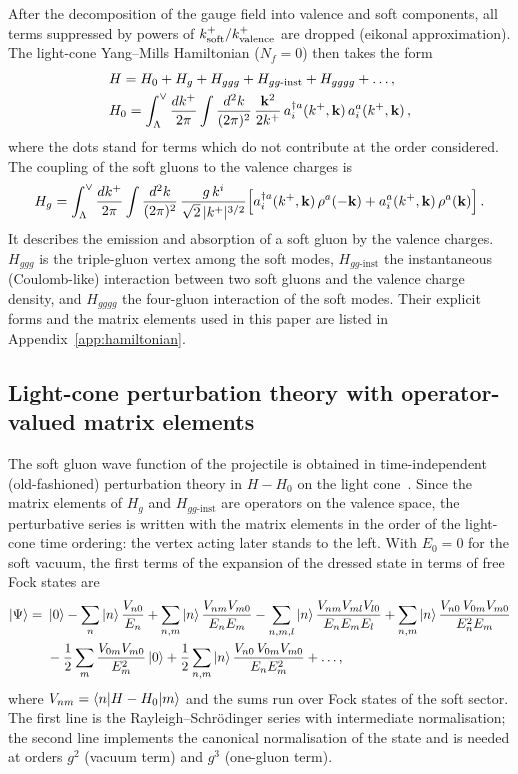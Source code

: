 After the decomposition of the gauge field into valence and soft components, all terms suppressed by powers of $k^+_{\rm soft}/k^+_{\rm valence}$ are dropped (eikonal approximation). The light-cone Yang--Mills Hamiltonian ($N_f=0$) then takes the form~\cite{Lublinsky:2016meo,Radhakrishnan:2026soft}
\begin{align}\label{eq:Hdecomp}
&H=H_0+H_g+H_{ggg}+H_{gg\text{-inst}}+H_{gggg}+\dots,\notag\\
&H_0=\int_\Lambda^\vee\frac{dk^+}{2\pi}\int\frac{d^2k}{(2\pi)^2}\,\frac{\mathbf{k}^2}{2k^+}\,a^{\dagger a}_i(k^+,\mathbf{k})\,a^a_i(k^+,\mathbf{k})\,,
\end{align}
where the dots stand for terms which do not contribute at the order considered. The coupling of the soft gluons to the valence charges is
\begin{align}\label{eq:Hg}
H_g=\int_\Lambda^\vee\frac{dk^+}{2\pi}\int\frac{d^2k}{(2\pi)^2}\,\frac{g\,k^i}{\sqrt2\,|k^+|^{3/2}}\Big[a^{\dagger a}_i(k^+,\mathbf{k})\,\rho^a(-\mathbf{k})+a^a_i(k^+,\mathbf{k})\,\rho^a(\mathbf{k})\Big]\,.
\end{align}
It describes the emission and absorption of a soft gluon by the valence charges. $H_{ggg}$ is the triple-gluon vertex among the soft modes, $H_{gg\text{-inst}}$ the instantaneous (Coulomb-like) interaction between two soft gluons and the valence charge density, and $H_{gggg}$ the four-gluon interaction of the soft modes. Their explicit forms and the matrix elements used in this paper are listed in Appendix~\ref{app:hamiltonian}.

\subsection{Light-cone perturbation theory with operator-valued matrix elements}\label{sec:lcpt}

The soft gluon wave function of the projectile is obtained in time-independent (old-fashioned) perturbation theory in $H-H_0$ on the light cone~\cite{Lepage:1980fj,Brodsky:1997de}. Since the matrix elements of $H_g$ and $H_{gg\text{-inst}}$ are operators on the valence space, the perturbative series is written with the matrix elements in the order of the light-cone time ordering: the vertex acting later stands to the left. With $E_0=0$ for the soft vacuum, the first terms of the expansion of the dressed state in terms of free Fock states are
\begin{align}\label{eq:lcpt}
\ket{\Psi}=\ &\ket0-\sum_n\ket n\frac{V_{n0}}{E_n}+\sum_{n,m}\ket n\frac{V_{nm}V_{m0}}{E_nE_m}
-\sum_{n,m,l}\ket n\frac{V_{nm}V_{ml}V_{l0}}{E_nE_mE_l}
+\sum_{n,m}\ket n\frac{V_{n0}\,V_{0m}V_{m0}}{E_n^2E_m}
\notag\\
&-\frac12\sum_m\frac{V_{0m}V_{m0}}{E_m^2}\ket0
+\frac12\sum_{n,m}\ket n\frac{V_{n0}\,V_{0m}V_{m0}}{E_nE_m^2}+\dots,
\end{align}
where $V_{nm}=\braket{n|H-H_0|m}$ and the sums run over Fock states of the soft sector. The first line is the Rayleigh--Schr\"odinger series with intermediate normalisation; the second line implements the canonical normalisation of the state and is needed at orders $g^2$ (vacuum term) and $g^3$ (one-gluon term). 

